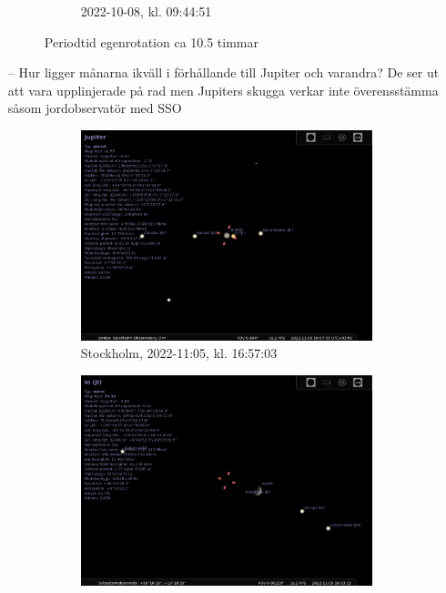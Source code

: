 \documentclass[./exercises.tex]{subfiles}
\begin{document}
\begin{itemize}
\begin{figure}[H]
\begin{subfigure}[b]{0.45\textwidth}
         \caption{2022-10-08, kl. 09:44:51}
         \label{fig:three sin x}
     \end{subfigure}
     \hfill
        \caption{Periodtid egenrotation ca 10.5 timmar}
        \label{fig:perod graphs}
\end{figure}
\item[--] Hur ligger månarna ikväll i förhållande till Jupiter och varandra?
De ser ut att vara upplinjerade på rad men Jupiters skugga verkar inte överensstämma
såsom jordobservatör med SSO
\begin{figure}[htbp]
     \centering
     \begin{subfigure}[b]{0.45\textwidth}
         \centering
         \includegraphics[width=\textwidth]{stellarium-046.png}
         \caption{Stockholm, 2022-11:05, kl. 16:57:03}
         \label{fig:y equals x}
     \end{subfigure}
     \hfill
     \begin{subfigure}[b]{0.45\textwidth}
         \centering
         \includegraphics[width=\textwidth]{stellarium-048.png}

\end{subfigure}
\end{figure}
\end{itemize}
\end{document}
